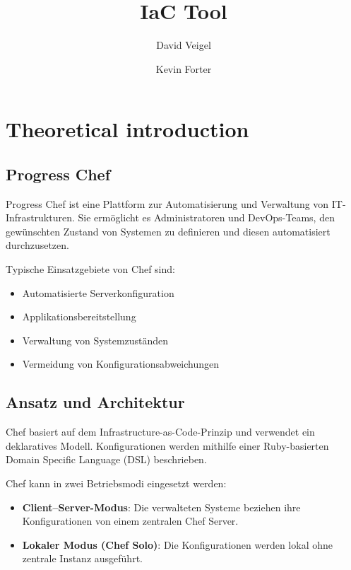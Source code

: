 \documentclass[BMR,Seminar,ngerman,IEEE]{twbook}
\title{IaC Tool}
\author{David Veigel \and Kevin Forter}
\begin{document}
\maketitle

\onecolumn
\newpage

\chapter{Theoretical introduction}

\section{Progress Chef}
Progress Chef ist eine Plattform zur Automatisierung und Verwaltung von IT-Infrastrukturen.
Sie ermöglicht es Administratoren und DevOps-Teams, den gewünschten Zustand von Systemen zu definieren und diesen automatisiert durchzusetzen.

Typische Einsatzgebiete von Chef sind:
\begin{itemize}
  \item Automatisierte Serverkonfiguration
  \item Applikationsbereitstellung
  \item Verwaltung von Systemzuständen
  \item Vermeidung von Konfigurationsabweichungen
\end{itemize}

\section{Ansatz und Architektur}
Chef basiert auf dem Infrastructure-as-Code-Prinzip und verwendet ein deklaratives Modell.
Konfigurationen werden mithilfe einer Ruby-basierten Domain Specific Language (DSL) beschrieben.

Chef kann in zwei Betriebsmodi eingesetzt werden:
\begin{itemize}
  \item \textbf{Client--Server-Modus}: Die verwalteten Systeme beziehen ihre Konfigurationen von einem zentralen Chef Server.
  \item \textbf{Lokaler Modus (Chef Solo)}: Die Konfigurationen werden lokal ohne zentrale Instanz ausgeführt.
\end{itemize}
\end{document}
